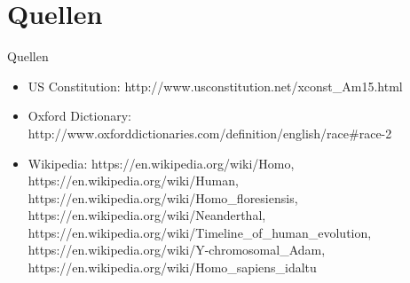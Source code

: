 \documentclass{beamer}
\begin{document}
	\section{Quellen}
	\begin{frame}{Quellen}
		\begin{itemize}
			\item US Constitution: http://www.usconstitution.net/xconst\_Am15.html
			\item Oxford Dictionary: http://www.oxforddictionaries.com/definition/english/race\#race-2
			\item Wikipedia: https://en.wikipedia.org/wiki/Homo, https://en.wikipedia.org/wiki/Human, https://en.wikipedia.org/wiki/Homo\_floresiensis, https://en.wikipedia.org/wiki/Neanderthal, https://en.wikipedia.org/wiki/Timeline\_of\_human\_evolution, https://en.wikipedia.org/wiki/Y-chromosomal\_Adam, https://en.wikipedia.org/wiki/Homo\_sapiens\_idaltu
		\end{itemize}
	\end{frame}
\end{document}
